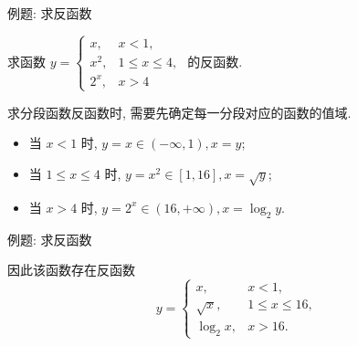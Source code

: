 \begin{frame}{例题: 求反函数}
	\onslide<+->
	\begin{example}
		求函数 $y=\begin{cases}
			x,&x<1,\\
			x^2,&1\le x\le 4,\\
			2^x,&x>4
		\end{cases}$ 的反函数.
	\end{example}
	\onslide<+->
	\begin{analysis}
		求分段函数反函数时, 需要先确定每一分段对应的函数的值域.
	\end{analysis}
	\onslide<+->
	\begin{solution}
		\begin{itemize}
			\item 当 $x<1$ 时, $y=x\in(-\infty,1), x=y$;
			\item 当 $1\le x\le 4$ 时, $y=x^2\in[1,16], x=\sqrt y$;
			\item 当 $x>4$ 时, $y=2^x\in(16,+\infty), x=\log_2 y$.
		\end{itemize}
	\end{solution}
\end{frame}


\begin{frame}{例题: 求反函数}
	\onslide<+->
	\begin{solutionc}
	因此该函数存在反函数
		\[y=\begin{cases}
			x,&x<1,\\
			\sqrt x,&1\le x\le 16,\\
			\log_2 x,&x>16.
		\end{cases}\]
	\end{solutionc}
\end{frame}

